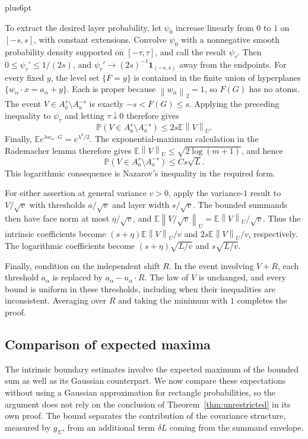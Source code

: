 \documentclass[11pt,letterpaper,twoside,leqno]{article}
\makeatletter
\theoremstyle{bookplain}
\theoremstyle{bookremark}
\renewenvironment{proof}[1][\proofname]{\par
  \pushQED{\qed}\normalfont\topsep6pt plus6pt\relax
  \trivlist\item[\hskip\labelsep\bfseries #1\@addpunct{.}]\ignorespaces
}{\popQED\endtrivlist\@endpefalse}
\newcommand{\E}{\mathbb E}
\newcommand{\Pp}{\mathbb P}
\newcommand{\norm}[1]{\left\lVert#1\right\rVert}
\newcommand{\ind}{\mathbf 1}
\makeatother
\begin{document}
\begin{proof}[Proof of Lemma~\ref{lem:concentration}]
To extract the desired layer probability, let $\psi_0$ increase
linearly from $0$ to $1$ on $[-s,s]$, with constant extensions.
Convolve $\psi_0$ with a nonnegative smooth probability density
supported on $[-\tau,\tau]$, and call the result $\psi_\tau$.
Then $0\le\psi_\tau'\le1/(2s)$, and
$\psi_\tau'\to(2s)^{-1}\ind_{(-s,s)}$ away from the endpoints.
For every fixed $y$, the level set $\{F=y\}$ is contained in
the finite union of hyperplanes
$\{w_\alpha\cdot x=a_\alpha+y\}$. Each is proper because
$\norm{w_\alpha}_2=1$, so $F(G)$ has no atoms.
The event $V\in A_a^s\setminus A_a^{-s}$ is exactly
$-s<F(G)\le s$. Applying the preceding inequality to $\psi_\tau$
and letting $\tau\downarrow0$ therefore gives
\[
 \Pp(V\in A_a^s\setminus A_a^{-s})
 \le2s\E\norm V_U.
\]
Finally,
$\E e^{\lambda w_\alpha\cdot G}=e^{\lambda^2/2}$.
The exponential-maximum calculation in the Rademacher lemma
therefore gives $\E\norm V_U\le\sqrt{2\log(m+1)}$, and hence
\[
 \Pp(V\in A_a^s\setminus A_a^{-s})\le Cs\sqrt L.
\]
This logarithmic consequence is Nazarov's inequality
\cite{Nazarov2003,CCK17N} in the required form.

For either assertion at general variance $v>0$, apply the
variance-$1$ result to $V/\sqrt v$ with thresholds $a/\sqrt v$
and layer width $s/\sqrt v$. The bounded summands then have
face norm at most $\eta/\sqrt v$, and
$\E\norm{V/\sqrt v}_U=\E\norm V_U/\sqrt v$.
Thus the intrinsic coefficients become
$(s+\eta)\E\norm V_U/v$ and $2s\E\norm V_U/v$, respectively.
The logarithmic coefficients become
$(s+\eta)\sqrt{L/v}$ and $s\sqrt{L/v}$.

Finally, condition on the independent shift $R$.
In the event involving $V+R$, each threshold $a_\alpha$ is
replaced by $a_\alpha-u_\alpha\cdot R$.
The law of $V$ is unchanged, and every bound is uniform in these
thresholds, including when their inequalities are inconsistent.
Averaging over $R$ and taking the minimum with $1$ completes
the proof.
\end{proof}

\subsection{Comparison of expected maxima}

The intrinsic boundary estimates involve the expected maximum of
the bounded sum as well as its Gaussian counterpart. We now compare
these expectations without using a Gaussian approximation for
rectangle probabilities, so the argument does not rely on the
conclusion of Theorem~\ref{thm:unrestricted} in its own proof.
The bound separates the contribution of the covariance structure,
measured by $g_\Sigma$, from an additional term $\delta L$
coming from the summand envelope.
\end{document}
